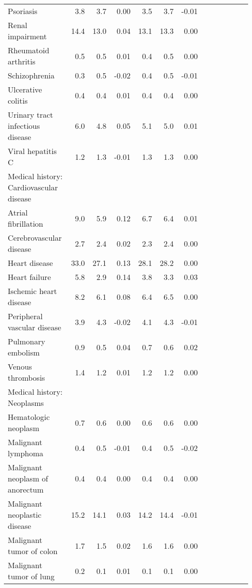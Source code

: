 \documentclass[11pt,]{article}
\begin{document}
\begin{longtable}{lrrrrrrrrrrrr}
      Psoriasis &  3.8 &   3.7 &  0.00 &  3.5 &   3.7 & -0.01 \\ 
      Renal impairment & 14.4 &  13.0 &  0.04 & 13.1 &  13.3 &  0.00 \\ 
      Rheumatoid arthritis &  0.5 &   0.5 &  0.01 &  0.4 &   0.5 &  0.00 \\ 
      Schizophrenia &  0.3 &   0.5 & -0.02 &  0.4 &   0.5 & -0.01 \\ 
      Ulcerative colitis &  0.4 &   0.4 &  0.01 &  0.4 &   0.4 &  0.00 \\ 
      Urinary tract infectious disease &  6.0 &   4.8 &  0.05 &  5.1 &   5.0 &  0.01 \\ 
      Viral hepatitis C &  1.2 &   1.3 & -0.01 &  1.3 &   1.3 &  0.00 \\ 
  Medical history: Cardiovascular disease &    &     &     &    &     &     \\ 
      Atrial fibrillation &  9.0 &   5.9 &  0.12 &  6.7 &   6.4 &  0.01 \\ 
      Cerebrovascular disease &  2.7 &   2.4 &  0.02 &  2.3 &   2.4 &  0.00 \\ 
      Heart disease & 33.0 &  27.1 &  0.13 & 28.1 &  28.2 &  0.00 \\ 
      Heart failure &  5.8 &   2.9 &  0.14 &  3.8 &   3.3 &  0.03 \\ 
      Ischemic heart disease &  8.2 &   6.1 &  0.08 &  6.4 &   6.5 &  0.00 \\ 
      Peripheral vascular disease &  3.9 &   4.3 & -0.02 &  4.1 &   4.3 & -0.01 \\ 
      Pulmonary embolism &  0.9 &   0.5 &  0.04 &  0.7 &   0.6 &  0.02 \\ 
      Venous thrombosis &  1.4 &   1.2 &  0.01 &  1.2 &   1.2 &  0.00 \\ 
  Medical history: Neoplasms &    &     &     &    &     &     \\ 
      Hematologic neoplasm &  0.7 &   0.6 &  0.00 &  0.6 &   0.6 &  0.00 \\ 
      Malignant lymphoma &  0.4 &   0.5 & -0.01 &  0.4 &   0.5 & -0.02 \\ 
      Malignant neoplasm of anorectum &  0.4 &   0.4 &  0.00 &  0.4 &   0.4 &  0.00 \\ 
      Malignant neoplastic disease & 15.2 &  14.1 &  0.03 & 14.2 &  14.4 & -0.01 \\ 
      Malignant tumor of colon &  1.7 &   1.5 &  0.02 &  1.6 &   1.6 &  0.00 \\ 
      Malignant tumor of lung &  0.2 &   0.1 &  0.01 &  0.1 &   0.1 &  0.00 \\ 

\end{longtable}
\end{document}
